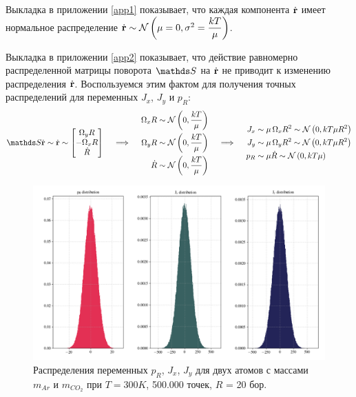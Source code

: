 Выкладка в приложении \ref{app1} показывает, что каждая компонента $\dot{\mathbf{r}}$ имеет нормальное распределение $\dot{\mathbf{r}} \sim \mathcal{N} \left( \mu = 0, \sigma^2 = \displaystyle \frac{kT}{\mu} \right)$. \par
Выкладка в приложении \ref{app2} показывает, что действие равномерно распределенной матрицы поворота $\bbS$ на $\dot{\mathbf{r}}$ не приводит к изменению распределения $\dot{\mathbf{r}}$. Воспользуемся этим фактом для получения точных распределений для переменных $J_x$, $J_y$ и $p_R$: 
\begin{gather}
	\bbS \dot{\mf{r}} \sim \dot{\mf{r}} \sim
	\begin{bmatrix}
		\Omega_y R \\
		- \Omega_x R \\
		\dot{R}
	\end{bmatrix}
	\quad \implies \quad
	\begin{aligned}
			\Omega_x R &\sim \mN \lb 0, \frac{k T}{\mu} \rb \\
			\Omega_y R &\sim \mN \lb 0, \frac{k T}{\mu} \rb \\
			\dot{R} &\sim \mN \lb 0, \frac{k T}{\mu} \rb 
	\end{aligned} \quad \implies \quad  
	\begin{aligned}
			J_x &\sim \mu \, \Omega_x R^2 \sim \mN \lb 0, k T \mu R^2 \rb \\
			J_y &\sim \mu \, \Omega_y R^2 \sim \mN \lb 0, k T \mu R^2 \rb \\
			p_R &\sim \mu \dot{R} \sim \mN \lb 0, k T \mu \rb  
	\end{aligned} \label{distr_exact}
\end{gather}

\begin{figure}[ht!]
		\includegraphics[width=\textwidth]{../pictures/diatomicsDistributions.png}
		\caption{Распределения переменных $p_R$, $J_x$, $J_y$ для двух атомов с массами $m_{Ar}$ и $m_{CO_2}$ при $T = 300 K$, 500.000 точек, $R$ = 20 бор.}
\end{figure}

